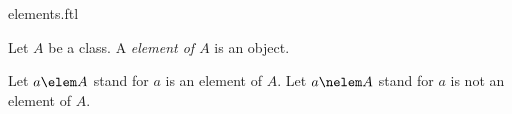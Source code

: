 \documentclass{naproche-library}
\begin{document}
\begin{smodule}[title=Elements of Classes]{elements.ftl}

\begin{fakeforthel}
  \begin{signature}
    Let $A$ be a class.
    A \emph{element of $A$} is an object.

    Let \emph{$a \elem A$} stand for $a$ is an element of $A$.
    Let \emph{$a \nelem A$} stand for $a$ is not an element of $A$.
  \end{signature}
\end{fakeforthel}
\end{smodule}
\end{document}
